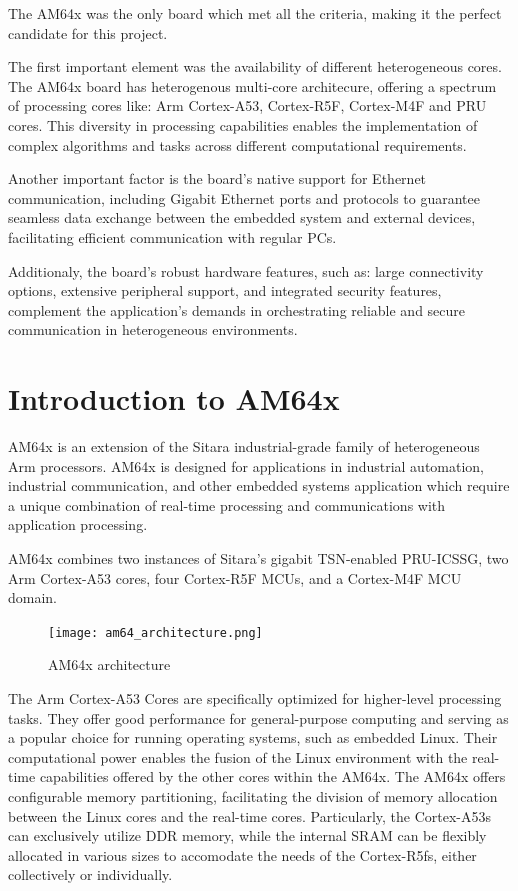The AM64x was the only board which met all the criteria, making it the perfect
candidate for this project.

The first important element was the availability of different heterogeneous
cores. The AM64x board has heterogenous multi-core architecure, offering a
spectrum of processing cores like: Arm Cortex-A53, Cortex-R5F, Cortex-M4F and
PRU cores. This diversity in processing capabilities enables the implementation
of complex algorithms and tasks across different computational requirements.

Another important factor is the board's native support for Ethernet
communication, including Gigabit Ethernet ports and protocols to guarantee 
seamless data exchange between the embedded system and external devices,
facilitating efficient communication with regular PCs.

Additionaly, the board's robust hardware features, such as: large connectivity
options, extensive peripheral support, and integrated security features,
complement the application's demands in orchestrating reliable and secure
communication in heterogeneous environments.

\section{Introduction to AM64x}

AM64x is an extension of the Sitara industrial-grade family of heterogeneous
Arm processors. \cite{AM64_datasheet}
AM64x is designed for applications in industrial automation, industrial
communication, and other embedded systems application which require a unique
combination of real-time processing and communications with application
processing. 

AM64x combines two instances of Sitara's gigabit TSN-enabled PRU-ICSSG,
two Arm Cortex-A53 cores, four Cortex-R5F MCUs, and a Cortex-M4F MCU
domain.

\begin{figure}[H]
    \centering
    \texttt{[image: am64\_architecture.png]}
    \caption{AM64x architecture}
\end{figure}

The Arm Cortex-A53 Cores are specifically optimized for higher-level
processing tasks.
They offer good performance for general-purpose computing and serving as a
popular choice for running operating systems, such as embedded Linux.
Their computational power enables the fusion of the Linux environment with the
real-time capabilities offered by the other cores within the AM64x.
The AM64x offers configurable memory partitioning, facilitating the division
of memory allocation between the Linux cores and the real-time cores.
Particularly, the Cortex-A53s can exclusively utilize DDR memory, while 
the internal SRAM can be flexibly allocated in various sizes to accomodate
the needs of the Cortex-R5fs, either collectively or individually.


